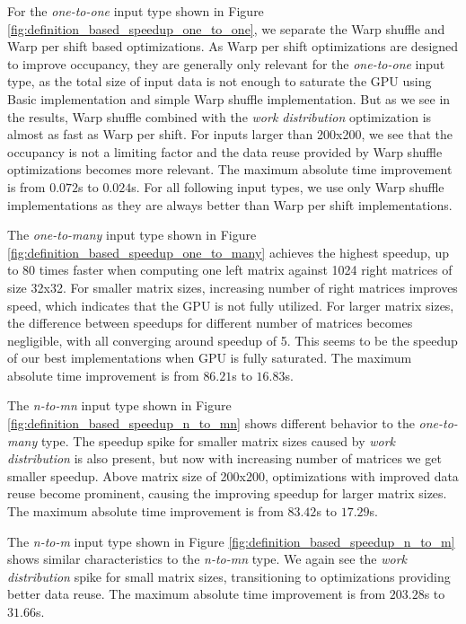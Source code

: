 For the \textit{one-to-one} input type shown in Figure \ref{fig:definition_based_speedup_one_to_one}, we separate the Warp shuffle and Warp per shift based optimizations. As Warp per shift optimizations are designed to improve occupancy, they are generally only relevant for the \textit{one-to-one} input type, as the total size of input data is not enough  to saturate the GPU using Basic implementation and simple Warp shuffle implementation. But as we see in the results, Warp shuffle combined with the \textit{work distribution} optimization is almost as fast as Warp per shift. For inputs larger than 200x200, we see that the occupancy is not a limiting factor and the data reuse provided by Warp shuffle optimizations becomes more relevant. The maximum absolute time improvement is from $0.072$s to $0.024$s. For all following input types, we use only Warp shuffle implementations as they are always better than Warp per shift implementations.

The \textit{one-to-many} input type shown in Figure \ref{fig:definition_based_speedup_one_to_many} achieves the highest speedup, up to 80 times faster when computing one left matrix against 1024 right matrices of size 32x32. For smaller matrix sizes, increasing number of right matrices improves speed, which indicates that the GPU is not fully utilized. For larger matrix sizes, the difference between speedups for different number of matrices becomes negligible, with all converging around speedup of 5. This seems to be the speedup of our best implementations when GPU is fully saturated. The maximum absolute time improvement is from $86.21$s to $16.83$s. 

The \textit{n-to-mn} input type shown in Figure \ref{fig:definition_based_speedup_n_to_mn} shows different behavior to the \textit{one-to-many} type. The speedup spike for smaller matrix sizes caused by \textit{work distribution} is also present, but now with increasing number of matrices we get smaller speedup. Above matrix size of 200x200, optimizations with improved data reuse become prominent, causing the improving speedup for larger matrix sizes. The maximum absolute time improvement is from $83.42$s to $17.29$s. 

The \textit{n-to-m} input type shown in Figure \ref{fig:definition_based_speedup_n_to_m} shows similar characteristics to the \textit{n-to-mn} type. We again see the \textit{work distribution} spike for small matrix sizes, transitioning to optimizations providing better data reuse. The maximum absolute time improvement is from $203.28$s to $31.66$s.

